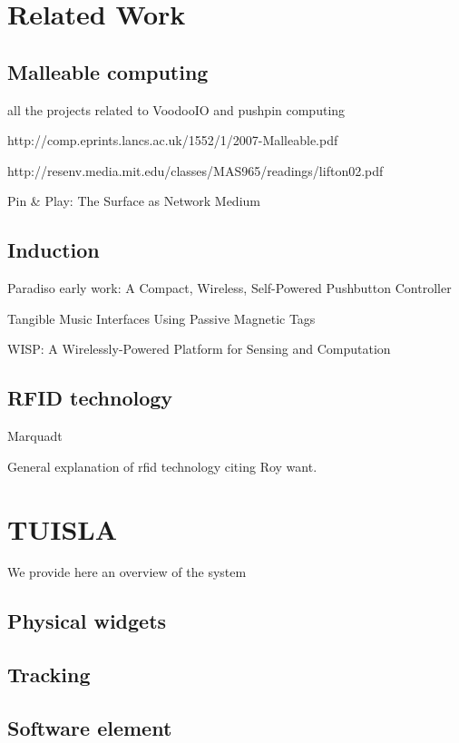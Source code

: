 \documentclass{ubicomp2013}
\begin{document}
\section{Related Work}


\subsection{Malleable computing}
all the projects related to VoodooIO and pushpin computing

http://comp.eprints.lancs.ac.uk/1552/1/2007-Malleable.pdf

http://resenv.media.mit.edu/classes/MAS965/readings/lifton02.pdf

Pin \& Play: The Surface as Network Medium

\subsection{Induction}
Paradiso early work: 
A Compact, Wireless, Self-Powered Pushbutton Controller

Tangible Music Interfaces Using Passive Magnetic Tags


WISP: A Wirelessly-Powered Platform for Sensing and Computation

\subsection{RFID technology}
Marquadt

General explanation of rfid technology citing Roy want.


\section{TUISLA}

We provide here an overview of the system

\subsection{Physical widgets}

\subsection{Tracking}

\subsection{Software element}
\end{document}
